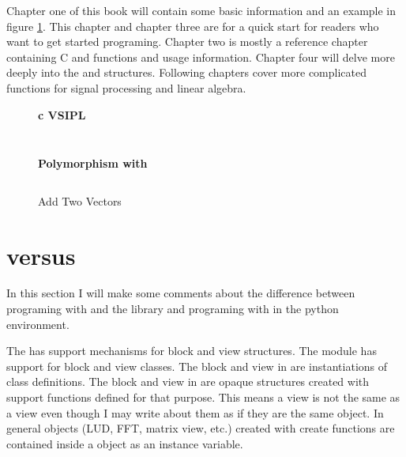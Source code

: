 Chapter one of this book will contain some basic information and an example in figure \ref{fig:addTwoVectors}. This chapter and chapter three are for a quick start for readers who want to get started programing. Chapter two is mostly a reference chapter containing C and \pyjv{} functions and usage information.  Chapter four will delve more deeply into the  and  structures.  Following chapters cover more complicated functions for signal processing and linear algebra.
%
\clearpage
\begin{figure}[t]
\caption{Add Two Vectors}
\label{fig:addTwoVectors}
\setlength{\parskip}{.25cm}
\begin{minipage}[t][20cm][t]{.475\textwidth}
{\begin{center} \bfseries{c VSIPL} \end{center}}\setlength{\parskip}{.25cm}
\inputminted[linenos=true,resetmargins=true,xleftmargin=.75cm,fontfamily=tt, fontsize= \small]{c}{./c_examples/example1.c}
\end{minipage}
\begin{minipage}[t][10cm][t]{.475\textwidth}
{\begin{center} \bfseries{\pyjv} \end{center}}\setlength{\parskip}{.25cm}
\inputminted[linenos=true,resetmargins=true,xleftmargin=.75cm,fontfamily=tt,fontsize=\small]{python}{./pyJvsip_examples/example1a.py}\setlength{\parskip}{.25cm}
{\begin{center} \bfseries{Polymorphism with \pyjv} \end{center}}\setlength{\parskip}{.25cm}
\inputminted[linenos=true,resetmargins=true,xleftmargin=.75cm,fontfamily=tt,fontsize=\small]{python}{./pyJvsip_examples/example1b.py}
\end{minipage}
\end{figure}
%
\section*{\cvl{} versus \pyjv}
In this section I will make some comments about the difference between programing with  and the \cvl{} library and programing with \pyjv{} in the python environment. 

The \cvl{} has support mechanisms for block and view structures. The \pyjv{} module has support for block and view classes. The block and view in \pyjv{} are instantiations of class definitions. The block and view in \cvl{} are opaque structures created with \cvl{} support functions defined for that purpose. This means a \pyjv{} view is not the same as a \cvl{} view even though I may write about them as if they are the same object. In general \cvl{} objects (LUD, FFT, matrix view, etc.) created with create functions are contained inside a \pyjv{} object as an instance variable.

